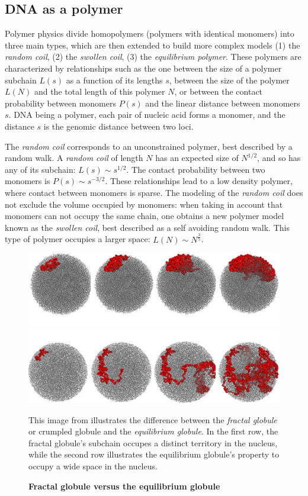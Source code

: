 \subsection{DNA as a polymer}

Polymer physics divide homopolymers (polymers with identical monomers) into
three main types, which are then extended to build more complex models (1) the
\textit{random coil}, (2) the \textit{swollen coil}, (3) the
\textit{equilibrium polymer}. These polymers are characterized by
relationships such as the one between the size of a polymer subchain $L(s)$ as
a function of its lengths $s$, between the size of the polymer $L(N)$ and the
total length of this polymer $N$, or between the contact probability between
monomers $P(s)$ and the linear distance between monomers $s$. DNA being a
polymer, each pair of nucleic acid forms a monomer, and the distance $s$ is the
genomic distance between two loci.

The \textit{random coil} corresponds to an unconstrained polymer, best
described by a random walk. A \textit{random coil} of length $N$ has an
expected size of $N^{1/2}$, and so has any of its subchain: $L(s) \sim
s^{1/2}$. The contact probability between two monomers is $P(s) \sim
s^{-3/2}$. These relationships lead to a low density polymer, where contact
between monomers is sparse. The modeling of the \textit{random coil} does not
exclude the volume occupied by monomers: when taking in account that monomers
can not occupy the same chain, one obtains a new polymer model known as the
\textit{swollen coil}, best described as a self avoiding random walk. This
type of polymer occupies a larger space: $L(N) \sim N^{\frac{3}{5}}$.

\begin{figure}
\begin{center}
\includegraphics[width=0.8\linewidth]{figures/mirny_fractal.png}
\includegraphics[width=0.8\linewidth]{figures/mirny_equilibrium.png}
\end{center}
\caption{\textbf{Fractal globule versus the equilibrium globule}}{This image
from \citet{mirny:fractal} illustrates the difference between the
\textit{fractal globule} or crumpled globule and the
\textit{equilibrium globule}. In the first row, the
fractal globule's subchain occupes a distinct territory in the nucleus, while
the second row illustrates the equilibrium globule's property to occupy a wide
space in the nucleus.}
\end{figure}

